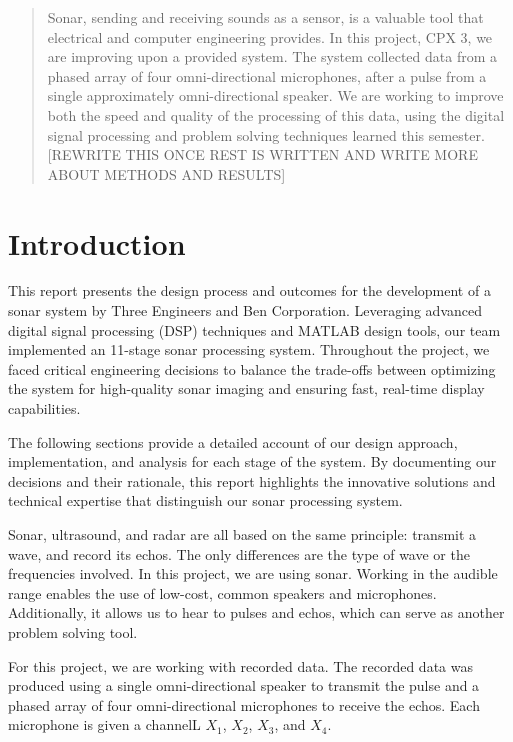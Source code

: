 



\begin{abstract}

Sonar, sending and receiving sounds as a sensor, is a valuable tool that electrical and computer engineering provides.  In this project, CPX 3, we are improving upon a provided system.  The system collected data from a phased array of four omni-directional microphones, after a pulse from a single approximately omni-directional speaker.  We are working to improve both the speed and quality of the processing of this data, using the digital signal processing and problem solving techniques learned this semester. [REWRITE THIS ONCE REST IS WRITTEN AND WRITE MORE ABOUT METHODS AND RESULTS]


\end{abstract}

\section{Introduction}

This report presents the design process and outcomes for the development of a sonar system by Three Engineers and Ben Corporation. Leveraging advanced digital signal processing (DSP) techniques and MATLAB design tools, our team implemented an 11-stage sonar processing system. Throughout the project, we faced critical engineering decisions to balance the trade-offs between optimizing the system for high-quality sonar imaging and ensuring fast, real-time display capabilities.

The following sections provide a detailed account of our design approach, implementation, and analysis for each stage of the system. By documenting our decisions and their rationale, this report highlights the innovative solutions and technical expertise that distinguish our sonar processing system.


Sonar, ultrasound, and radar are all based on the same principle: transmit a wave, and record its echos.  The only differences are the type of wave or the frequencies involved.  In this project, we are using sonar.  Working in the audible range enables the use of low-cost, common speakers and microphones.  Additionally, it allows us to hear to pulses and echos, which can serve as another problem solving tool.

For this project, we are working with recorded data.  The recorded data was produced using a single omni-directional speaker to transmit the pulse and a phased array of four omni-directional microphones to receive the echos.  Each microphone is given a channelL $X_1$, $X_2$, $X_3$, and $X_4$.

